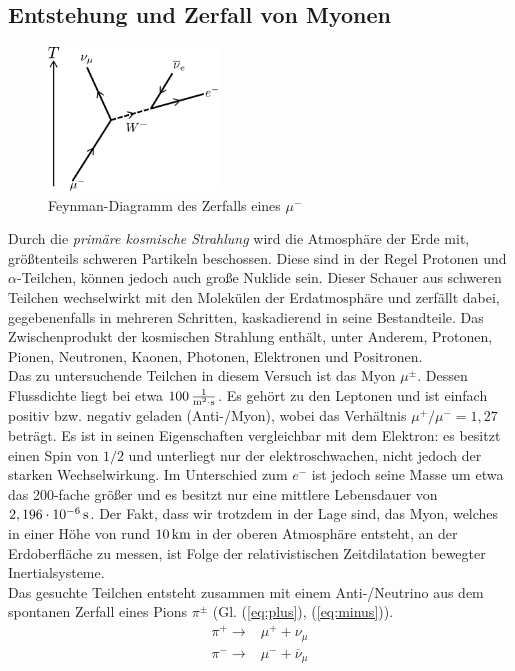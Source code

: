 \documentclass[numbers=noenddot,12pt,a4paper]{scrartcl}
\newcommand{\tilt}[1]{\textit{#1}}
\begin{document}
\subsection{Entstehung und Zerfall von Myonen}
\begin{figure}
	\centering
	\includegraphics[width=0.4\textwidth]{Muon_Decay.pdf}
	\caption{Feynman-Diagramm des Zerfalls eines $\mu^-$}\label{img:zerfall}
\end{figure}
Durch die \tilt{primäre kosmische Strahlung} wird die Atmosphäre der Erde mit, größtenteils schweren Partikeln beschossen. Diese sind in der Regel Protonen und $\alpha$-Teilchen, können jedoch auch große Nuklide sein. Dieser Schauer aus schweren Teilchen wechselwirkt mit den Molekülen der Erdatmosphäre und zerfällt dabei, gegebenenfalls in mehreren Schritten, kaskadierend in seine Bestandteile. Das Zwischenprodukt der kosmischen Strahlung enthält, unter Anderem, Protonen, Pionen, Neutronen, Kaonen, Photonen, Elektronen und Positronen.\\
Das zu untersuchende Teilchen in diesem Versuch ist das Myon $\mu^\pm$. Dessen Flussdichte liegt bei etwa $\unit[100]{\frac{1}{m^2\cdot s}}$. Es gehört zu den Leptonen und ist einfach positiv bzw. negativ geladen (Anti-/Myon), wobei das Verhältnis $\mu^+/\mu^-=1,27$ beträgt. Es ist in seinen Eigenschaften vergleichbar mit dem Elektron: es besitzt einen Spin von $1/2$ und unterliegt nur der elektroschwachen, nicht jedoch der starken Wechselwirkung. Im Unterschied zum $e^-$ ist jedoch seine Masse um etwa das 200-fache größer und es besitzt nur eine mittlere Lebensdauer von $\unit[2,196\cdot 10^{-6}]{s}$. Der Fakt, dass wir trotzdem in der Lage sind, das Myon, welches in einer Höhe von rund $\unit[10]{km}$ in der oberen Atmosphäre entsteht, an der Erdoberfläche zu messen, ist Folge der relativistischen Zeitdilatation bewegter Inertialsysteme.\\
Das gesuchte Teilchen entsteht zusammen mit einem Anti-/Neutrino aus dem spontanen Zerfall eines Pions $\pi^\pm$ (Gl. (\ref{eq:plus}), (\ref{eq:minus})).
\begin{align}
\pi^+\rightarrow&\mu^++\nu_\mu \label{eq:plus}\\
\pi^-\rightarrow&\mu^-+\overline{\nu}_\mu \label{eq:minus}
\end{align}
\end{document}
